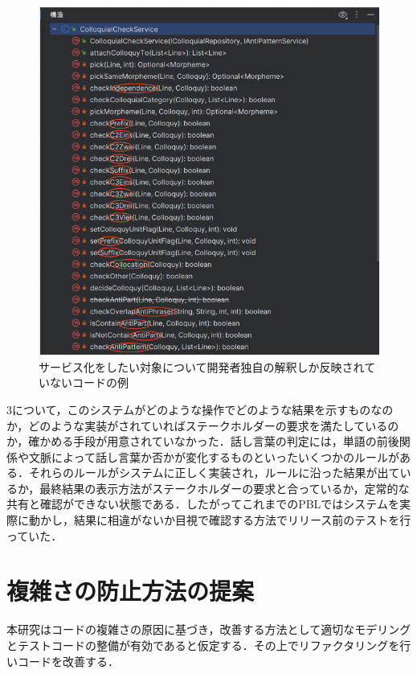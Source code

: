 \documentclass[12pt, a4paper]{jreport}
\begin{document}
\begin{figure}[H]
\centering
\includegraphics[width=1\linewidth]{image/genin2.1.png}
\caption{サービス化をしたい対象について開発者独自の解釈しか反映されていないコードの例}
\label{fig:enter-label}
\end{figure}
3について，このシステムがどのような操作でどのような結果を示すものなのか，どのような実装がされていればステークホルダーの要求を満たしているのか，確かめる手段が用意されていなかった．話し言葉の判定には，単語の前後関係や文脈によって話し言葉か否かが変化するものといったいくつかのルールがある．それらのルールがシステムに正しく実装され，ルールに沿った結果が出ているか，最終結果の表示方法がステークホルダーの要求と合っているか，定常的な共有と確認ができない状態である．したがってこれまでのPBLではシステムを実際に動かし，結果に相違がないか目視で確認する方法でリリース前のテストを行っていた．
\section{複雑さの防止方法の提案}
本研究はコードの複雑さの原因に基づき，改善する方法として適切なモデリングとテストコードの整備が有効であると仮定する．その上でリファクタリングを行いコードを改善する．
\end{document}
